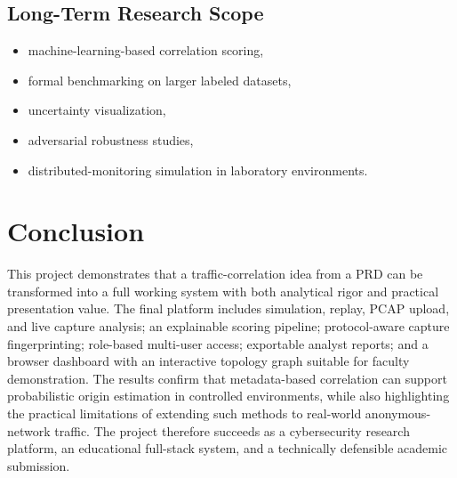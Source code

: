\documentclass[12pt,a4paper]{report}
\begin{document}
\section{Long-Term Research Scope}
\begin{itemize}[leftmargin=1.5em]
    \item machine-learning-based correlation scoring,
    \item formal benchmarking on larger labeled datasets,
    \item uncertainty visualization,
    \item adversarial robustness studies,
    \item distributed-monitoring simulation in laboratory environments.
\end{itemize}

\chapter{Conclusion}
This project demonstrates that a traffic-correlation idea from a PRD can be transformed into a full working system with both analytical rigor and practical presentation value. The final platform includes simulation, replay, PCAP upload, and live capture analysis; an explainable scoring pipeline; protocol-aware capture fingerprinting; role-based multi-user access; exportable analyst reports; and a browser dashboard with an interactive topology graph suitable for faculty demonstration. The results confirm that metadata-based correlation can support probabilistic origin estimation in controlled environments, while also highlighting the practical limitations of extending such methods to real-world anonymous-network traffic. The project therefore succeeds as a cybersecurity research platform, an educational full-stack system, and a technically defensible academic submission.
\end{document}

